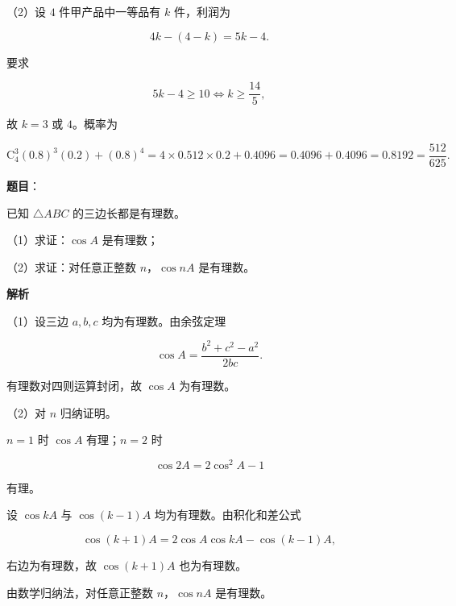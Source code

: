 \begin{answer}
（2）设 $4$ 件甲产品中一等品有 $k$ 件，利润为

\nopagebreak[4]
\[4k-(4-k)=5k-4.\]

要求

\nopagebreak[4]
\[5k-4\geqslant10\iff k\geqslant\frac{14}5,\]

故 $k=3$ 或 $4$。概率为

\nopagebreak[4]
\[\mathrm C_4^3(0.8)^3(0.2)+(0.8)^4
=4\times0.512\times0.2+0.4096
=0.4096+0.4096=0.8192=\frac{512}{625}.\]


\end{answer}
\begin{answer}

\textbf{题目}：

已知 $\triangle ABC$ 的三边长都是有理数。

（1）求证：$\cos A$ 是有理数；

（2）求证：对任意正整数 $n$，$\cos nA$ 是有理数。

\textbf{解析}

（1）设三边 $a,b,c$ 均为有理数。由余弦定理

\nopagebreak[4]
\[\cos A=\frac{b^2+c^2-a^2}{2bc}.\]

有理数对四则运算封闭，故 $\cos A$ 为有理数。

（2）对 $n$ 归纳证明。

$n=1$ 时 $\cos A$ 有理；$n=2$ 时

\nopagebreak[4]
\[\cos2A=2\cos^2A-1\]

有理。

设 $\cos kA$ 与 $\cos(k-1)A$ 均为有理数。由积化和差公式

\nopagebreak[4]
\[\cos(k+1)A=2\cos A\cos kA-\cos(k-1)A,\]

右边为有理数，故 $\cos(k+1)A$ 也为有理数。

由数学归纳法，对任意正整数 $n$，$\cos nA$ 是有理数。


\end{answer}